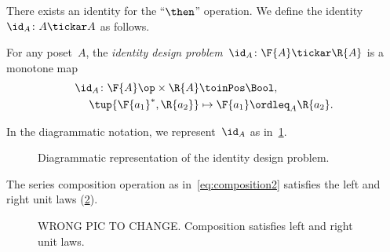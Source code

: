 There exists an identity for the ``$\then$'' operation.
We define the identity~$\id_A\colon A \tickar A$ as follows.

\begin{definition}
\label{def:dp-identity}
For any poset~$A$, the \emph{identity design problem}~$\id_A\colon \F{A} \tickar \R{A}$ is a monotone map
\begin{equation}
\begin{aligned}
  \id_A \colon \F{A}\op \times \R{A} & \toinPos   \Bool, \label{eq:identity}\\
  \tup{\F{a_1}^*, \R{a_2}} & \mapsto \F{a_1} \ordleq_{A} \R{a_2}.
\end{aligned}
\end{equation}
\end{definition}
In the diagrammatic notation, we represent~$\id_A$ as in~\cref{fig:identitydp}.

\begin{figure}[h!]
    \begin{center}
\end{center}
\caption{Diagrammatic representation of the identity design problem. \label{fig:identitydp}}
\end{figure}

\begin{lemma}
    The series composition operation as in~\cref{eq:composition2} satisfies the left and right unit laws (\cref{fig:compositionunital}).
\begin{figure}[h!]
\begin{center}
\end{center}
\caption{WRONG PIC TO CHANGE. Composition satisfies left and right unit laws. \label{fig:compositionunital}}
\end{figure}
\end{lemma}

